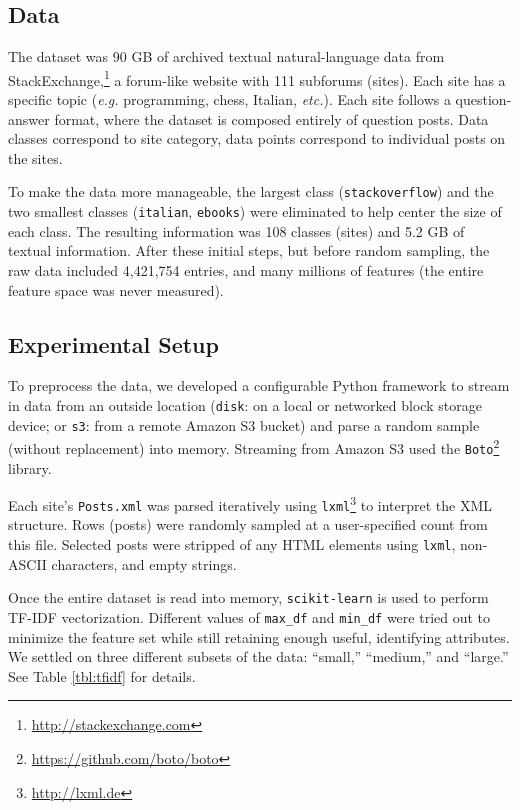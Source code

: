\documentclass[letterpaper,10pt]{article}
\begin{document}
\subsection{Data}

The dataset was 90 GB of archived textual natural-language data from
StackExchange,\footnote{\url{http://stackexchange.com}} a forum-like
website with 111 subforums (sites). Each site has a specific topic
(\textit{e.g.} programming, chess, Italian, \textit{etc.}). Each site
follows a question-answer format, where the dataset is composed entirely of
question posts. Data classes correspond to site category, data points
correspond to individual posts on the sites.

To make the data more manageable, the largest class
(\texttt{stackoverflow}) and the two smallest classes (\texttt{italian},
\texttt{ebooks}) were eliminated to help center the size of each class.
The resulting information was 108 classes (sites) and 5.2 GB of textual
information. After these initial steps, but before random sampling, the raw
data included 4,421,754 entries, and many millions of features (the entire
feature space was never measured).


\subsection{Experimental Setup}

To preprocess the data, we developed a configurable Python framework to
stream in data from an outside location (\texttt{disk}: on a local or
networked block storage device; or \texttt{s3}: from a remote Amazon S3
bucket) and parse a random sample (without replacement) into memory.
Streaming from Amazon S3 used the
\texttt{Boto}\footnote{\url{https://github.com/boto/boto}} library.

Each site's \texttt{Posts.xml} was parsed iteratively using
\texttt{lxml}\footnote{\url{http://lxml.de}} to interpret the XML
structure. Rows (posts) were randomly sampled at a user-specified count
from this file. Selected posts were stripped of any HTML elements using
\texttt{lxml}, non-ASCII characters, and empty strings.

Once the entire dataset is read into memory, \texttt{scikit-learn} is used
to perform TF-IDF vectorization. Different values of \texttt{max\_df} and
\texttt{min\_df} were tried out to minimize the feature set while still
retaining enough useful, identifying attributes. We settled on three
different subsets of the data: ``small,'' ``medium,'' and ``large.'' See
Table \ref{tbl:tfidf} for details.
\end{document}
